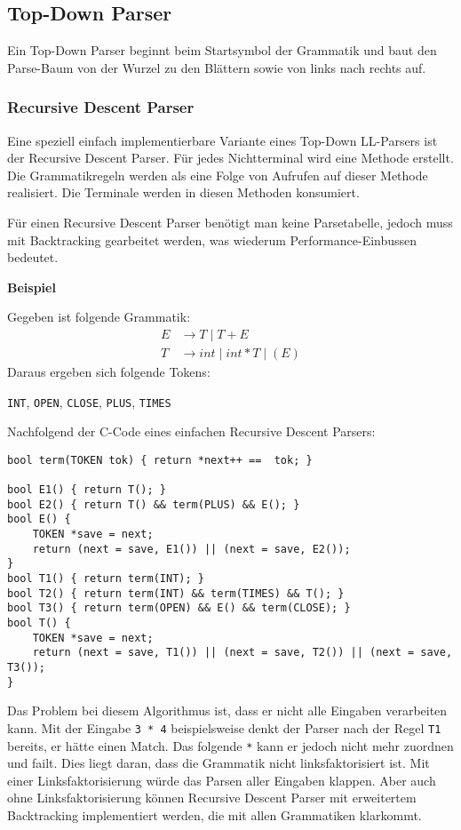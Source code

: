 \subsection{Top-Down Parser} 

Ein Top-Down Parser beginnt beim Startsymbol der Grammatik und baut den
Parse-Baum von der Wurzel zu den Blättern sowie von links nach rechts auf.

\subsubsection{Recursive Descent Parser}

Eine speziell einfach implementierbare Variante eines Top-Down LL-Parsers ist
der Recursive Descent Parser. Für jedes Nichtterminal wird eine Methode
erstellt. Die Grammatikregeln werden als eine Folge von Aufrufen auf dieser
Methode realisiert. Die Terminale werden in diesen Methoden konsumiert.

Für einen Recursive Descent Parser benötigt man keine Parsetabelle, jedoch muss
mit Backtracking gearbeitet werden, was wiederum Performance-Einbussen bedeutet.

\textbf{Beispiel}

Gegeben ist folgende Grammatik:
%
\begin{align*}
	E &\rightarrow T \mid T + E \\
	T &\rightarrow int \mid int * T \mid (E)
\end{align*}
%
Daraus ergeben sich folgende Tokens:

\texttt{INT}, \texttt{OPEN}, \texttt{CLOSE}, \texttt{PLUS}, \texttt{TIMES}

Nachfolgend der C-Code eines einfachen Recursive Descent Parsers:

\begin{verbatim}
bool term(TOKEN tok) { return *next++ ==  tok; }

bool E1() { return T(); }
bool E2() { return T() && term(PLUS) && E(); }
bool E() {
    TOKEN *save = next;
    return (next = save, E1()) || (next = save, E2());
}
bool T1() { return term(INT); }
bool T2() { return term(INT) && term(TIMES) && T(); }
bool T3() { return term(OPEN) && E() && term(CLOSE); }
bool T() {
    TOKEN *save = next;
    return (next = save, T1()) || (next = save, T2()) || (next = save, T3());
}
\end{verbatim}

Das Problem bei diesem Algorithmus ist, dass er nicht alle Eingaben verarbeiten
kann. Mit der Eingabe \texttt{3 * 4} beispielsweise denkt der Parser nach der
Regel \texttt{T1} bereits, er hätte einen Match. Das folgende \texttt{*} kann er
jedoch nicht mehr zuordnen und failt. Dies liegt daran, dass die Grammatik nicht
linksfaktorisiert ist. Mit einer Linksfaktorisierung würde das Parsen aller
Eingaben klappen. Aber auch ohne Linksfaktorisierung können Recursive Descent
Parser mit erweitertem Backtracking implementiert werden, die mit allen
Grammatiken klarkommt.


